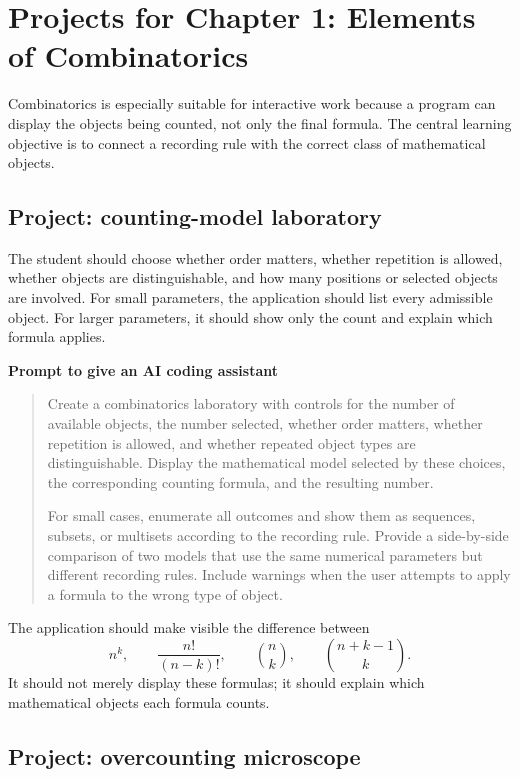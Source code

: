 \section{Projects for Chapter 1: Elements of Combinatorics}

Combinatorics is especially suitable for interactive work because a program can display the objects being counted, not only the final formula. The central learning objective is to connect a recording rule with the correct class of mathematical objects.

\subsection*{Project: counting-model laboratory}

The student should choose whether order matters, whether repetition is allowed, whether objects are distinguishable, and how many positions or selected objects are involved. For small parameters, the application should list every admissible object. For larger parameters, it should show only the count and explain which formula applies.

\begin{examplebox}
\textbf{Prompt to give an AI coding assistant}

\begin{quote}\small
Create a combinatorics laboratory with controls for the number of available objects, the number selected, whether order matters, whether repetition is allowed, and whether repeated object types are distinguishable. Display the mathematical model selected by these choices, the corresponding counting formula, and the resulting number.

For small cases, enumerate all outcomes and show them as sequences, subsets, or multisets according to the recording rule. Provide a side-by-side comparison of two models that use the same numerical parameters but different recording rules. Include warnings when the user attempts to apply a formula to the wrong type of object.
\end{quote}
\end{examplebox}

The application should make visible the difference between
\[
n^k,\qquad
\frac{n!}{(n-k)!},\qquad
\binom nk,
\qquad
\binom{n+k-1}{k}.
\]
It should not merely display these formulas; it should explain which mathematical objects each formula counts.

\subsection*{Project: overcounting microscope}

